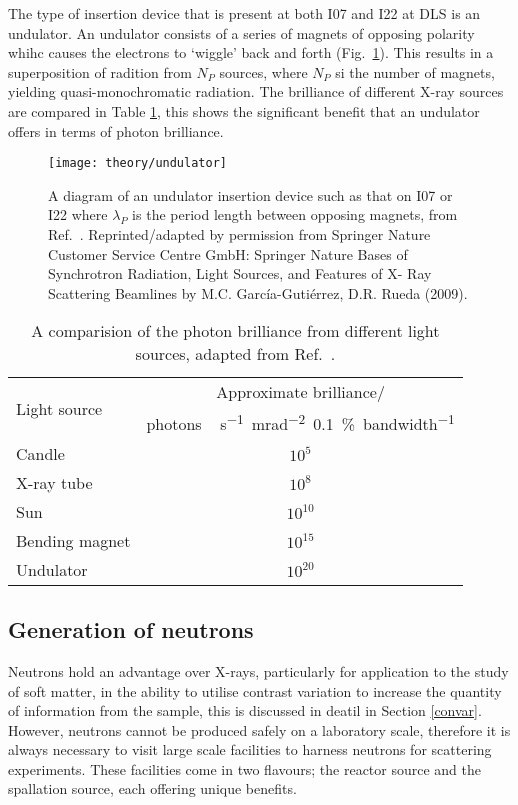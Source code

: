The type of insertion device that is present at both I07 and I22 at DLS is an undulator. An undulator consists of a series of magnets of opposing polarity whihc causes the electrons to `wiggle' back and forth (Fig.~\ref{fig:undulator}). This results in a superposition of radition from $N_P$ sources, where $N_P$ si the number of magnets, yielding quasi-monochromatic radiation. The brilliance of different X-ray sources are compared in Table \ref{tab:sources}, this shows the significant benefit that an undulator offers in terms of photon brilliance.
%
\begin{figure}
	\centering
	\texttt{[image: theory/undulator]}
	\caption{A diagram of an undulator insertion device such as that on I07 or I22 where $\lambda_P$ is the period length between opposing magnets, from Ref.~\cite{Garcia-Gutierrez2009}. Reprinted/adapted by permission from Springer Nature Customer Service Centre GmbH: Springer Nature Bases of Synchrotron Radiation, Light Sources, and Features of X- Ray Scattering Beamlines by M.C. Garc\'{i}a-Guti\'{e}rrez, D.R. Rueda\textsuperscript{\textcopyright} (2009).}
	\label{fig:undulator}
\end{figure}
%
%
\begin{table}
	\centering
	\caption{A comparision of the photon brilliance from different light sources, adapted from Ref.~\cite{Sivia2011}.}
	\label{tab:sources}
	\begin{tabular}{l | c}
		\toprule
		\multirow{2}{*}{Light source } & Approximate brilliance/ \\
 & \si{photons\,\second^{-1}\milli\radian^{-2}{0.1}\percent bandwidth^{-1}} \\
		\midrule
		Candle & $10^5$ \\
		X-ray tube & $10^8$ \\
		Sun & $10^{10}$ \\
		Bending magnet & $10^{15}$ \\
		Undulator & $10^{20}$ \\
		\bottomrule
	\end{tabular}
\end{table}

\subsection{Generation of neutrons}

Neutrons hold an advantage over X-rays, particularly for application to the study of soft matter, in the ability to utilise contrast variation to increase the quantity of information from the sample, this is discussed in deatil in Section \ref{convar}. However, neutrons cannot be produced safely on a laboratory scale, therefore it is always necessary to visit large scale facilities to harness neutrons for scattering experiments. These facilities come in two flavours; the reactor source and the spallation source, each offering unique benefits.

